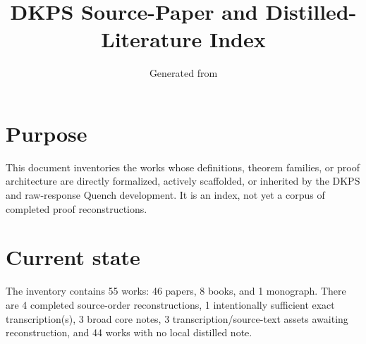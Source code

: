 \documentclass[10pt]{article}
\title{DKPS Source-Paper and Distilled-Literature Index}
\author{}
\date{Generated from \code{source\_manifest.json}}
\begin{document}
\maketitle
\section*{Purpose}
This document inventories the works whose definitions, theorem families, or proof architecture are directly formalized, actively scaffolded, or inherited by the DKPS and raw-response Quench development. It is an index, not yet a corpus of completed proof reconstructions.
\section*{Current state}
The inventory contains 55 works: 46 papers, 8 books, and 1 monograph. There are 4 completed source-order reconstructions, 1 intentionally sufficient exact transcription(s), 3 broad core notes, 3 transcription/source-text assets awaiting reconstruction, and 44 works with no local distilled note.
\end{document}
